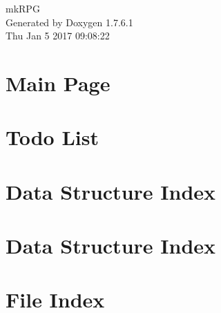 \documentclass[a4paper]{book}
\begin{document}
\hypersetup{pageanchor=false,citecolor=blue}
\begin{titlepage}
\vspace*{7cm}
\begin{center}
{\Large mk\-R\-P\-G }\\
\vspace*{1cm}
{\large \-Generated by Doxygen 1.7.6.1}\\
\vspace*{0.5cm}
{\small Thu Jan 5 2017 09:08:22}\\
\end{center}
\end{titlepage}
\clearemptydoublepage
{}
\tableofcontents
\clearemptydoublepage
{}
\hypersetup{pageanchor=true,citecolor=blue}
\chapter{\-Main \-Page}
\label{index}\hypertarget{index}{}
\chapter{\-Todo \-List}
\label{todo}
\hypertarget{todo}{}

\chapter{\-Data \-Structure \-Index}

\chapter{\-Data \-Structure \-Index}

\chapter{\-File \-Index}

\end{document}
